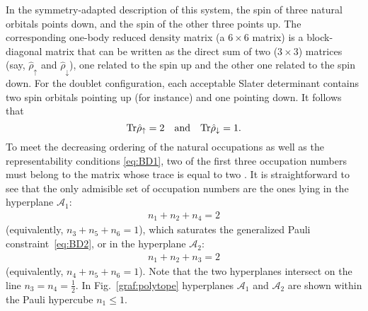 \documentclass[aps,twocolumn,showpacs,pra,superscriptaddress,floatfix,longbibliography]{revtex4-1}
\newcommand{\word}[1]{\quad\mbox{#1}\quad}
\newcommand{\7}{\dagger}
\newcommand{\up}{\uparrow}
\newcommand{\dn}{\downarrow}
\newcommand{\Tr}{\rm Tr}
\renewcommand{\word}[1]{\quad\mbox{#1}\quad} %
\begin{document}
In the symmetry-adapted description of this system, the spin of 
three natural orbitals points down, and the spin of the
other three points up. The corresponding one-body 
reduced density matrix (a $6\times 6$ matrix) is
a block-diagonal matrix that can be written as the
direct sum of two ($3\times 3$) matrices (say,
$\hat \rho_\up$ and $\hat \rho_\dn$),
one related to the spin up and the other one related to 
the spin down. For the doublet configuration,
each acceptable Slater determinant contains two spin
orbitals pointing up (for instance) and one pointing down. 
It follows that
\begin{equation}
\Tr \hat  \rho_\up = 2 \word{and} \Tr \hat \rho_\dn = 1.
\end{equation}
To meet the decreasing ordering of the natural occupations
as well as the representability conditions \eqref{eq:BD1}, 
two of the first three occupation numbers must belong to the 
matrix whose trace is equal to two \cite{BenavQuasi2}.
It is straightforward to see that the only admisible 
set of occupation numbers are the ones lying  
in the hyperplane $\mathcal{A}_1$:
\begin{align}
\label{eq:const1}
n_1 + n_2 + n_4 = 2
\end{align}
(equivalently, $n_3 + n_5 + n_ 6= 1$), 
which saturates the generalized Pauli  
constraint~\eqref{eq:BD2}, or in the hyperplane 
$\mathcal{A}_2$:
 \begin{align}
\label{eq:const2}
n_1 + n_2 + n_3 = 2
\end{align}
(equivalently, $n_4 + n_5 + n_6 = 1$).
Note that the two hyperplanes intersect on the line
$n_3 = n_4 = \tfrac12$. In Fig.~\ref{graf:polytope} 
hyperplanes $\mathcal{A}_1$ and $\mathcal{A}_2$
are shown within the Pauli hypercube $n_1 \leq 1$.
\end{document}
